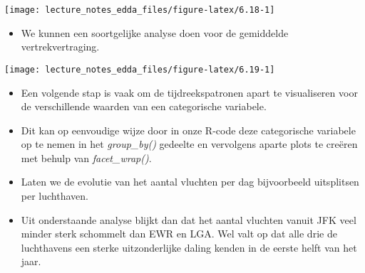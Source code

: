 \documentclass[]{memoir}
\newenvironment{Shaded}{\begin{snugshade}}{\end{snugshade}}
\newcommand{\DataTypeTok}[1]{\textcolor[rgb]{0.13,0.29,0.53}{#1}}
\newcommand{\KeywordTok}[1]{\textcolor[rgb]{0.13,0.29,0.53}{\textbf{#1}}}
\newcommand{\NormalTok}[1]{#1}
\newcommand{\OperatorTok}[1]{\textcolor[rgb]{0.81,0.36,0.00}{\textbf{#1}}}
\newcommand{\StringTok}[1]{\textcolor[rgb]{0.31,0.60,0.02}{#1}}
\providecommand{\tightlist}{%
  \setlength{\itemsep}{0pt}\setlength{\parskip}{0pt}}
\begin{document}
\begin{Shaded}
\end{Shaded}

\texttt{[image: lecture\_notes\_edda\_files/figure-latex/6.18-1]}

\begin{itemize}
\tightlist
\item
  We kunnen een soortgelijke analyse doen voor de gemiddelde vertrekvertraging.
\end{itemize}

\begin{Shaded}
\end{Shaded}

\texttt{[image: lecture\_notes\_edda\_files/figure-latex/6.19-1]}

\begin{itemize}
\tightlist
\item
  Een volgende stap is vaak om de tijdreekspatronen apart te visualiseren voor de verschillende waarden van een categorische variabele.
\item
  Dit kan op eenvoudige wijze door in onze R-code deze categorische variabele op te nemen in het \emph{group\_by()} gedeelte en vervolgens aparte plots te creëren met behulp van \emph{facet\_wrap()}.
\item
  Laten we de evolutie van het aantal vluchten per dag bijvoorbeeld uitsplitsen per luchthaven.
\item
  Uit onderstaande analyse blijkt dan dat het aantal vluchten vanuit JFK veel minder sterk schommelt dan EWR en LGA. Wel valt op dat alle drie de luchthavens een sterke uitzonderlijke daling kenden in de eerste helft van het jaar.
\end{itemize}
\end{document}
